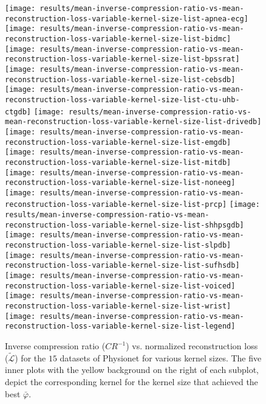 \documentclass[journal]{IEEEtran}
\begin{document}
\begin{figure*}[!t]
	\texttt{[image: results/mean-inverse-compression-ratio-vs-mean-reconstruction-loss-variable-kernel-size-list-apnea-ecg]}
	\texttt{[image: results/mean-inverse-compression-ratio-vs-mean-reconstruction-loss-variable-kernel-size-list-bidmc]}
	\texttt{[image: results/mean-inverse-compression-ratio-vs-mean-reconstruction-loss-variable-kernel-size-list-bpssrat]}
	\texttt{[image: results/mean-inverse-compression-ratio-vs-mean-reconstruction-loss-variable-kernel-size-list-cebsdb]}
	\\
	\texttt{[image: results/mean-inverse-compression-ratio-vs-mean-reconstruction-loss-variable-kernel-size-list-ctu-uhb-ctgdb]}
	\texttt{[image: results/mean-inverse-compression-ratio-vs-mean-reconstruction-loss-variable-kernel-size-list-drivedb]}
	\texttt{[image: results/mean-inverse-compression-ratio-vs-mean-reconstruction-loss-variable-kernel-size-list-emgdb]}
	\texttt{[image: results/mean-inverse-compression-ratio-vs-mean-reconstruction-loss-variable-kernel-size-list-mitdb]}
	\\
	\texttt{[image: results/mean-inverse-compression-ratio-vs-mean-reconstruction-loss-variable-kernel-size-list-noneeg]}
	\texttt{[image: results/mean-inverse-compression-ratio-vs-mean-reconstruction-loss-variable-kernel-size-list-prcp]}
	\texttt{[image: results/mean-inverse-compression-ratio-vs-mean-reconstruction-loss-variable-kernel-size-list-shhpsgdb]}
	\texttt{[image: results/mean-inverse-compression-ratio-vs-mean-reconstruction-loss-variable-kernel-size-list-slpdb]}
	\\
	\texttt{[image: results/mean-inverse-compression-ratio-vs-mean-reconstruction-loss-variable-kernel-size-list-sufhsdb]}
	\texttt{[image: results/mean-inverse-compression-ratio-vs-mean-reconstruction-loss-variable-kernel-size-list-voiced]}
	\texttt{[image: results/mean-inverse-compression-ratio-vs-mean-reconstruction-loss-variable-kernel-size-list-wrist]}
	\texttt{[image: results/mean-inverse-compression-ratio-vs-mean-reconstruction-loss-variable-kernel-size-list-legend]}
	\caption{Inverse compression ratio ($CR^{-1}$) vs. normalized reconstruction loss ($\tilde{\mathcal{L}}$) for the $15$ datasets of Physionet for various kernel sizes.
	The five inner plots with the yellow background on the right of each subplot, depict the corresponding kernel for the kernel size that achieved the best $\bar\varphi$.}
	\label{fig:crrl}
\end{figure*}
\end{document}
